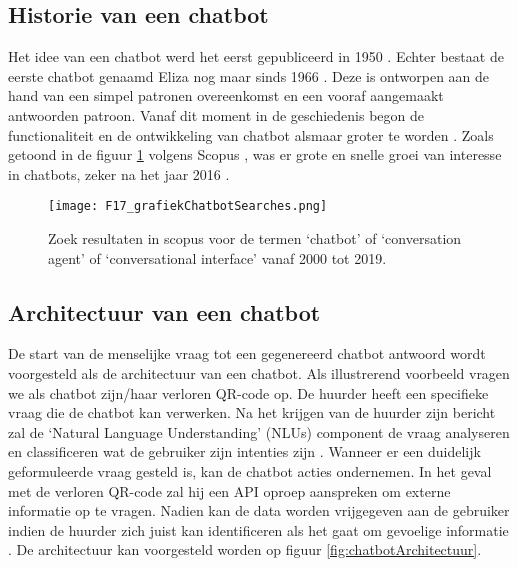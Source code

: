 \subsection{Historie van een chatbot}%
\label{sec:chatbotHistorie}

Het idee van een chatbot werd het eerst gepubliceerd in 1950 \autocite{Turing2009}. Echter bestaat de eerste chatbot genaamd Eliza nog maar sinds 1966 \autocite{Weizenbaum1966}. Deze is ontworpen aan de hand van een simpel patronen overeenkomst en een vooraf aangemaakt antwoorden patroon.  Vanaf dit moment in de geschiedenis begon de functionaliteit en de ontwikkeling van chatbot alsmaar groter te worden \autocite{Brandtzaeg2017}. Zoals getoond in de figuur \ref{fig:graphDocusChatbotAYear} volgens Scopus \autocite{Elsevier2004}, was er grote en snelle groei van interesse in chatbots, zeker na het jaar 2016 \autocite{Adamopoulou2020}.

\begin{figure}[h]
    \centering
    \texttt{[image: F17\_grafiekChatbotSearches.png]}
    \captionsetup{justification=centering, singlelinecheck=false}    
    \caption{Zoek resultaten in scopus voor de termen ‘chatbot’ of ‘conversation agent’ of ‘conversational interface’ vanaf 2000 tot 2019.}
    \label{fig:graphDocusChatbotAYear}
\end{figure}


\subsection{Architectuur  van een chatbot}%
\label{sec:chatbotArchitectuur}

De start van de menselijke vraag tot een gegenereerd chatbot antwoord wordt voorgesteld als de architectuur van een chatbot. Als illustrerend voorbeeld vragen we als chatbot zijn/haar verloren QR-code op. De huurder heeft een specifieke vraag die de chatbot kan verwerken. Na het krijgen van de huurder zijn bericht zal de ‘Natural Language Understanding’ (NLUs) \autocite{Khanna2015} component de vraag analyseren en classificeren wat de gebruiker zijn intenties zijn \autocite{Tamrakar2021}. Wanneer er een duidelijk geformuleerde vraag gesteld is, kan de chatbot acties ondernemen. In het geval met de verloren QR-code zal hij een API oproep aanspreken om externe informatie op te vragen. Nadien kan de data worden vrijgegeven aan de gebruiker indien de huurder zich juist kan identificeren als het gaat om gevoelige informatie \autocite{Adamopoulou2020}. De architectuur kan voorgesteld worden op figuur \ref{fig:chatbotArchitectuur}.

